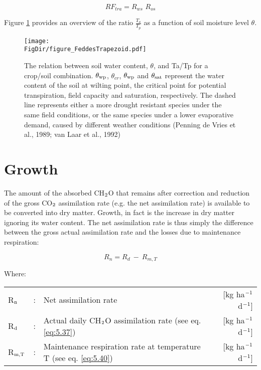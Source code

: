 \begin{equation}
\label{eq:6.14}
RF_{tra} = R_{ws} \,\, R_{os}
\end{equation}

Figure \ref{fig:TaTp_vs_soilmoisture} provides an overview of the ratio $\frac{T_a}{T_p}$ as
a function of soil moisture level $\theta$. 


\begin{figure}[p]
	\centering
	\texttt{[image: \\FigDir/figure\_FeddesTrapezoid.pdf]}
	\caption{The relation between soil water content, $\theta$, and Ta/Tp for a crop/soil combination. 
		$\theta_{{\rm wp}}$, $\theta_{cr}$, $\theta_{{\rm wp}}$ and $\theta_{{\rm sat}}$ represent the water
		 content of the soil at wilting point, the critical point for potential transpiration, field capacity 
		 and saturation, respectively. The dashed line represents either a more drought resistant species under
		 the same field conditions, or the same species under a lower evaporative demand, caused by different
		 weather conditions (Penning de Vries et al., 1989; van Laar et al., 1992)}
	\label{fig:TaTp_vs_soilmoisture}
\end{figure}

\section{Growth}

The amount of the absorbed CH$_{{\rm 2}}$O that remains after correction and reduction of the
gross CO$_{{\rm 2}}$ assimilation rate (e.g. the net assimilation rate) is available to be 
converted into dry matter. Growth, 
in fact is the increase in dry matter ignoring its water content. The net assimilation rate
is thus simply the difference between the gross actual assimilation rate and the losses due to
maintenance respiration:

\begin{equation}
	R_{n} = R_{d} ~-~ R _{m,T} 
\end{equation}

Where:\\[5pt]
\begin{tabularx}{\textwidth}{llXr}
	R$_{{\rm n}}$ &:& Net assimilation rate   &     [kg ha$^{{\rm -1}}$ d$^{{\rm -1}}$]\\
	R$_{{\rm d}}$ &:& Actual daily CH$_{{\rm 2}}$O assimilation rate (see eq. \ref{eq:5.37})   &   
	[kg ha$^{{\rm -1}}$ d$^{{\rm -1}}$]\\
	R$_{{\rm m,T}}$ &:& Maintenance respiration rate at 
	temperature T (see eq. \ref{eq:5.40})   &     [kg ha$^{{\rm -1}}$ d$^{{\rm -1}}$]\\
\end{tabularx}

